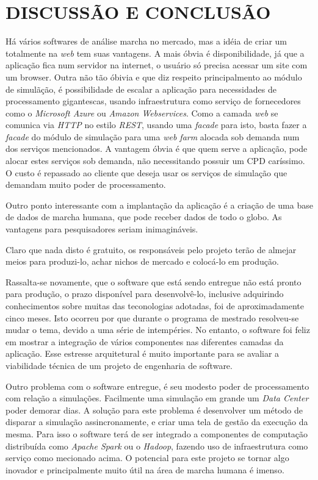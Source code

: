 \chapter[DISCUSSÃO E CONCLUSÃO]{\textbf{DISCUSSÃO E CONCLUSÃO}}

Há vários softwares de análise marcha no mercado, mas a idéia de criar um totalmente na \emph{web} tem suas vantagens. 
A mais óbvia é disponibilidade, já que a aplicação fica num servidor na internet, o usuário só precisa acessar um site com um browser. 
Outra não tão óbivia e que diz respeito principalmento ao módulo de simulãção, é possibilidade de escalar a aplicação para necessidades de processamento gigantescas, usando infraestrutura como serviço de fornecedores como o \emph{Microsoft Azure} ou \emph{Amazon Webservices}.
Como a camada \emph{web} se comunica via \emph{HTTP} no estilo \emph{REST}, usando uma \emph{facade} para isto, basta fazer a \emph{facade} do módulo de simulação para uma \emph{web farm} alocada sob demanda num dos serviços mencionados. A vantagem óbvia é que quem serve a aplicação, pode alocar estes serviços sob demanda, não necessitando possuir um CPD caríssimo. O custo é repassado ao cliente que deseja usar os serviços de simulação que demandam muito poder de processamento.

Outro ponto interessante com a implantação da aplicação é a criação de uma base de dados de marcha humana, que pode receber dados de todo o globo. 
As vantagens para pesquisadores seriam inimagináveis.

Claro que nada disto é gratuito, os responsáveis pelo projeto terão de almejar meios para produzi-lo, achar nichos de mercado e colocá-lo em produção.

Rassalta-se novamente, que o software que está sendo entregue não está pronto para produção, o prazo disponível para desenvolvê-lo, inclusive adquirindo conhecimentos sobre muitas das teconologias adotadas, foi de aproximadamente cinco meses. Isto ocorreu por que durante o programa de mestrado resolveu-se mudar o tema, devido a uma série de intempéries. No entanto, o software foi feliz em mostrar a integração de vários componentes nas diferentes camadas da aplicação. Esse estresse arquitetural é muito importante para se avaliar a viabilidade técnica de um projeto de engenharia de software.

Outro problema com o software entregue, é seu modesto poder de processamento com relação a simulações. 
Facilmente uma simulação em grande um \emph{Data Center} poder demorar dias. 
A solução para este problema é desenvolver um método de disparar a simulação assincronamente, e criar uma tela de gestão da execução da mesma. 
Para isso o software terá de ser integrado a componentes de computação distribuída como \emph{Apache Spark} ou o \emph{Hadoop}, fazendo uso de infraestrutura como serviço como mecionado acima. 
O potencial para este projeto se tornar algo inovador e principalmente muito útil na área de marcha humana é imenso.

